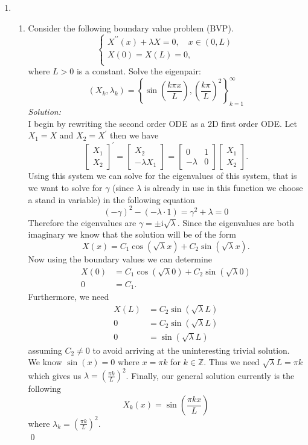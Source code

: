 \documentclass[10pt]{amsart}
\newcommand{\I}{\mathrm{i}}
\theoremstyle{nonumberplain}
\begin{document}
\begin{enumerate}[label={\bf {\arabic*}:}]
\item 
\begin{enumerate}
\item Consider the following boundary value problem (BVP). \\
$$
\begin{cases}
X^{\prime\prime}(x) + \lambda X = 0, \quad x \in (0, L) \\
X(0)  = X(L) = 0, \\
\end{cases}
$$
where $L > 0$ is a constant.
Solve the eigenpair:
$$
(X_k, \lambda_k) = \left\{ \sin \left( \frac {k \pi x}{L} \right), \left(\frac {k \pi}{L} \right)^2 \right\}_{k=1}^\infty
$$
\textit{Solution:} \\
I begin by rewriting the second order ODE as a 2D first order ODE.
Let $X_1 = X$ and $X_2 = X^\prime$ then we have
$$
\begin{bmatrix}
X_1 \\
X_2
\end{bmatrix}^\prime =
\begin{bmatrix}
X_2 \\
-\lambda X_1
\end{bmatrix} =
\begin{bmatrix}
0 &1 \\
-\lambda &0
\end{bmatrix}
\begin{bmatrix}
X_1 \\
X_2
\end{bmatrix}.
$$
Using this system we can solve for the eigenvalues of this system, that is we want to solve for $\gamma$ (since $\lambda$ is already in use in this function we choose a stand in variable) in the following equation
$$
(-\gamma)^2 - (-\lambda \cdot 1) = \gamma^2 + \lambda = 0
$$
Therefore the eigenvalues are $\gamma = \pm \I \sqrt{\lambda}$.
Since the eigenvalues are both imaginary we know that the solution will be of the form
$$
X(x) = C_1 \cos(\sqrt \lambda x) + C_2 \sin(\sqrt \lambda x).
$$
Now using the boundary values we can determine
\begin{align*}
X(0) &= C_1 \cos(\sqrt \lambda 0) + C_2 \sin(\sqrt \lambda 0) \\
0 &= C_1.
\end{align*}
Furthermore, we need
\begin{align*}
X(L) &= C_2 \sin(\sqrt \lambda L) \\
0 &= C_2 \sin(\sqrt \lambda L) \\
0 &= \sin(\sqrt \lambda L)
\end{align*}
assuming $C_2 \neq 0$ to avoid arriving at the uninteresting trivial solution.
We know $\sin(x) = 0$ where $x = \pi k$ for $k \in \mathbb Z$.
Thus we need $\sqrt \lambda L = \pi k$ which gives us $\lambda = \left( \frac {\pi k } L \right)^2$.
Finally, our general solution currently is the following
$$
X_k(x) = \sin \left( \frac{\pi k x} L \right)
$$
where $\lambda_k = \left( \frac {\pi k } L \right)^2$. \\
\qed \\
\newpage


\end{enumerate}
\end{enumerate}
\end{document}
